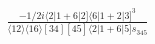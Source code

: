 \documentclass[varwidth, border=5pt]{standalone}
\begin{document}
\begin{my}
$\begin{gathered}
\scriptscriptstyle\frac{-1/2i\langle2|1+6|2]\langle6|1+2|3]^3}{\langle12\rangle\langle16\rangle[34][45]\langle2|1+6|5]s_{345}}
\end{gathered}$
\end{my}
\end{document}
